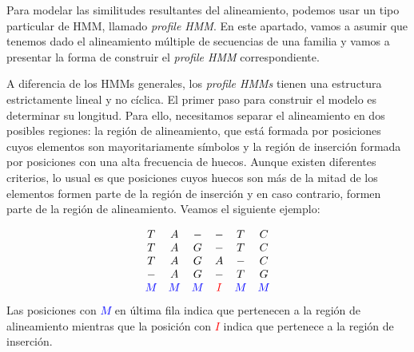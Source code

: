Para modelar las similitudes resultantes del alineamiento, podemos usar un tipo particular de HMM, llamado \textit{profile HMM}. En este apartado, vamos a asumir que tenemos dado el alineamiento múltiple de secuencias de una familia y vamos a presentar la forma de construir el \textit{profile HMM} correspondiente. 

A diferencia de los HMMs generales, los \textit{profile HMMs} tienen una estructura estrictamente lineal y no cíclica. El primer paso para construir el modelo es determinar su longitud. Para ello, necesitamos separar el alineamiento en dos posibles regiones: la región de alineamiento, que está formada por posiciones cuyos elementos son mayoritariamente símbolos y la región de inserción formada por posiciones con una alta frecuencia de huecos. Aunque existen diferentes criterios, lo usual es que posiciones cuyos huecos son más de la mitad de los elementos formen parte de la región de inserción y en caso contrario, formen parte de la región de alineamiento. Veamos el siguiente ejemplo:

\begin{exampleth} \label{alineamientoMúltiple}
    \[\begin{array}{c c c c c c}
        T & A & - & -  & T & C \\
        T & A & G & -  & T & C \\
        T & A & G & A  & - & C \\
        - & A & G & -  & T & G \\
        \textcolor{blue}{M} & \textcolor{blue}{M} & \textcolor{blue}{M} & \textcolor{red}{I} & \textcolor{blue}{M} & \textcolor{blue}{M}
    \end{array}\]    
    Las posiciones con \textcolor{blue}{$M$} en última fila indica que pertenecen a la región de alineamiento mientras que la posición con \textcolor{red}{$I$} indica que pertenece a la región de inserción.
\end{exampleth}

